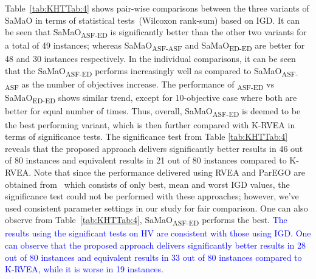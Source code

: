 Table~\ref{tab:KHTTab:4} shows pair-wise comparisons between the three variants of SaMaO in terms of statistical tests~(Wilcoxon rank-sum) based on IGD. It can be seen that SaMaO\textsubscript{ASF-ED} is significantly better than the other two variants for a total of 49 instances; whereas SaMaO\textsubscript{ASF-ASF} and SaMaO\textsubscript{ED-ED} are better for 48 and 30 instances respectively. {\color{blue} In the individual comparisons, it can be seen that the SaMaO\textsubscript{ASF-ED} performs increasingly well as compared to SaMaO\textsubscript{ASF-ASF} as the number of objectives increase. The performance of \textsubscript{ASF-ED} vs SaMaO\textsubscript{ED-ED} shows similar trend, except for 10-objective case where both are better for equal number of times. Thus, overall, SaMaO\textsubscript{ASF-ED} is deemed to be the best performing variant,} which is then further compared with K-RVEA in terms of significance tests. The significance test from Table \ref{tab:KHTTab:4} reveals that the proposed approach delivers significantly better results in 46 out of 80 instances and equivalent results in 21 out of 80 instances compared to K-RVEA. Note that since the performance delivered using RVEA and ParEGO are obtained from~\cite{KHTchugh2016krvea} which consists of only best, mean and worst IGD values, the significance test could not be performed with these approaches; {\color{blue}however, we've used consistent parameter settings in our study for fair comparison}. One can also observe from Table~\ref{tab:KHTTab:4}, SaMaO\textsubscript{ASF-ED} performs the best. \textcolor{blue}{The results using the significant tests on HV are consistent with those using IGD. One can observe that the proposed approach delivers significantly better results in 28 out of 80 instances and equivalent results in 33 out of 80 instances compared to K-RVEA, while it is worse in 19 instances.}

